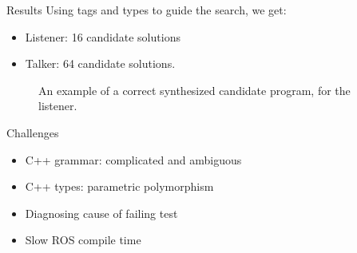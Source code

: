 \documentclass[final]{beamer}
\newlength{\onecolwid}
\begin{document}
\begin{frame}[t]
\begin{columns}[t]
\begin{column}{\onecolwid}
\begin{block}{Results}
Using tags and types to guide the search, we get:
\begin{itemize}
\item Listener: 16 candidate solutions
\item Talker: 64 candidate solutions.
\end{itemize}
\end{block}

\begin{figure}


\caption{An example of a correct synthesized candidate program, for the listener.}
\end{figure}





\begin{block}{Challenges}
\begin{itemize}
\item C++ grammar: complicated and ambiguous
\item C++ types: parametric polymorphism
\item Diagnosing cause of failing test
\item Slow ROS compile time %
\end{itemize}


\end{block}
\end{column}
\end{columns}
\end{frame}
\end{document}
